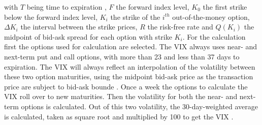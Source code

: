 with $T$ being time to expiration , $F$ the forward index level, $K_{0}$ the first strike below the forward index level, $K_{i}$ the strike of the $i^{th}$ out-of-the-money option, $\Delta K_{i}$ the interval between the strike prices, $R$ the risk-free rate and $Q(K_{i})$ the midpoint of bid-ask spread for each option with strike $K_{i}$. For the calculation first the options used for calculation are selected. The VIX always uses near- and next-term put and call options, with more than 23 and less than 37 days to expiration. The VIX will always reflect an interpolation of the volatility between these two option maturities, using the midpoint bid-ask price as the transaction price are subject to bid-ask bounde \parencite{poon2003}. Once a week the options to calculate the VIX roll over to new maturities. Then the volatility for both the near- and next-term options is calculated. Out of this two volatility, the 30-day-weighted average is calculated, taken as square root and multiplied by 100 to get the VIX \parencite{exchange2009}. 


